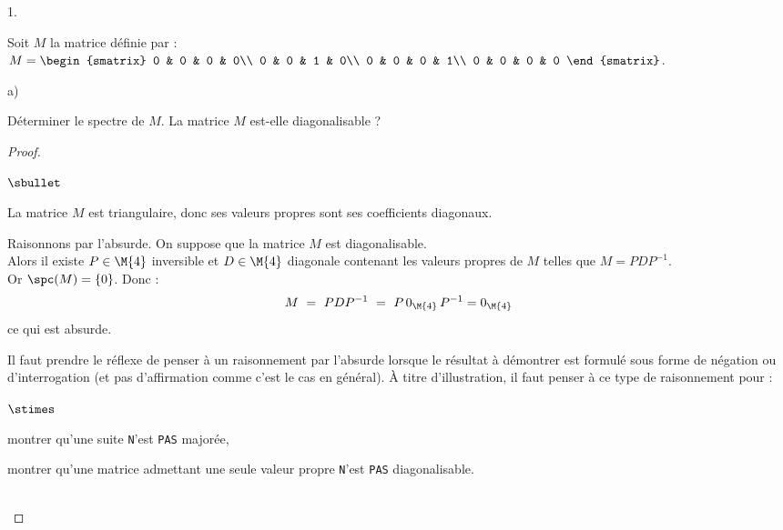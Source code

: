 \documentclass[11pt]{article}%
\begin{document}
\begin{noliste}{1.}
  \setlength{\itemsep}{4mm}
  \item Soit $M$ la matrice définie par : 
  $M = \begin{smatrix}
    0 & 0 & 0 & 0\\
    0 & 0 & 1 & 0\\
    0 & 0 & 0 & 1\\
    0 & 0 & 0 & 0
  \end{smatrix}$.
  \begin{noliste}{a)}
    \setlength{\itemsep}{2mm}
    \item Déterminer le spectre de $M$. La matrice $M$ est-elle 
    diagonalisable ?
    
    \begin{proof}~
      \begin{noliste}{$\sbullet$}
	\item La matrice $M$ est triangulaire, donc ses valeurs propres
	sont ses coefficients diagonaux.
	
	\item Raisonnons par l'absurde.
	On suppose que la matrice $M$ est diagonalisable.\\
	Alors il existe $P \in \M{4}$ inversible et $D \in \M{4}$ 
	diagonale contenant les valeurs propres de $M$ telles que 
	$M=PDP^{-1}$.\\
	Or $\spc(M)=\{0\}$. Donc :
	\[
	  M \ = \ PDP^{-1} \ = \ P \, 0_{\M{4}} \, P^{-1} = 0_{\M{4}}
	\]
	ce qui est absurde.
      \end{noliste}
      
      \begin{remark}
        Il faut prendre le réflexe de penser à un raisonnement par 
        l'absurde lorsque le résultat à démontrer est formulé sous 
        forme de négation ou d'interrogation (et pas d'affirmation 
        comme c'est le cas en général). À titre d'illustration, il 
        faut penser à ce type de raisonnement pour :
        \begin{noliste}{$\stimes$}
          \item montrer qu'une suite {\tt N}'est {\tt PAS} majorée,
          \item montrer qu'une matrice admettant une seule valeur
          propre {\tt N}'est {\tt PAS} diagonalisable.
        \end{noliste}
      \end{remark}~\\[-1.4cm]
    \end{proof}


\end{noliste}
\end{noliste}
\end{document}
